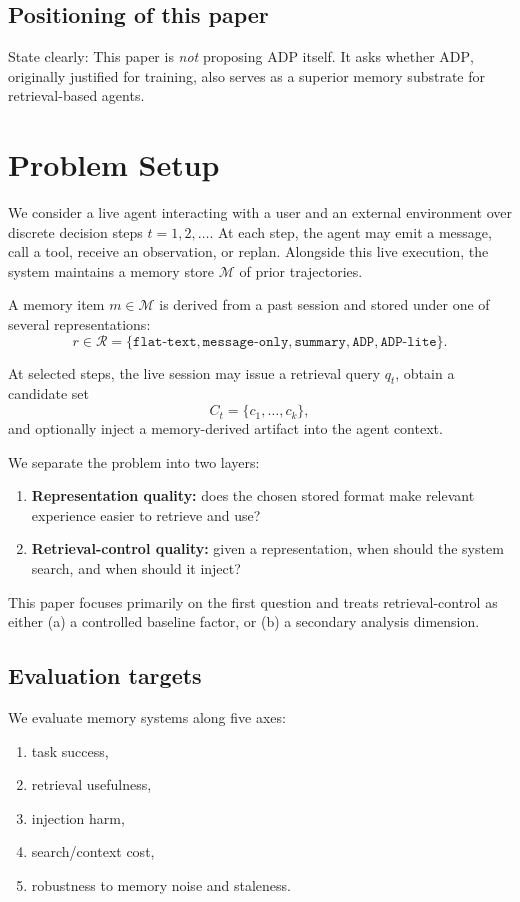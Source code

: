 \documentclass{article}
\newcommand{\ADP}{\textsc{ADP}}
\begin{document}
\subsection{Positioning of this paper}
State clearly:
This paper is \emph{not} proposing \ADP{} itself.
It asks whether \ADP{}, originally justified for training, also serves as a superior memory substrate for
retrieval-based agents.

\section{Problem Setup}

We consider a live agent interacting with a user and an external environment over discrete decision steps
$t = 1,2,\ldots$.
At each step, the agent may emit a message, call a tool, receive an observation, or replan.
Alongside this live execution, the system maintains a memory store $\mathcal{M}$ of prior trajectories.

A memory item $m \in \mathcal{M}$ is derived from a past session and stored under one of several
representations:
\[
r \in \mathcal{R}
=
\{
\texttt{flat-text},
\texttt{message-only},
\texttt{summary},
\texttt{ADP},
\texttt{ADP-lite}
\}.
\]

At selected steps, the live session may issue a retrieval query $q_t$, obtain a candidate set
\[
C_t = \{c_1,\dots,c_k\},
\]
and optionally inject a memory-derived artifact into the agent context.

We separate the problem into two layers:
\begin{enumerate}[leftmargin=*,itemsep=2pt,topsep=2pt]
    \item \textbf{Representation quality:}
    does the chosen stored format make relevant experience easier to retrieve and use?
    \item \textbf{Retrieval-control quality:}
    given a representation, when should the system search, and when should it inject?
\end{enumerate}

This paper focuses primarily on the first question and treats retrieval-control as either
(a) a controlled baseline factor, or
(b) a secondary analysis dimension.

\subsection{Evaluation targets}
We evaluate memory systems along five axes:
\begin{enumerate}[leftmargin=*,itemsep=2pt,topsep=2pt]
    \item task success,
    \item retrieval usefulness,
    \item injection harm,
    \item search/context cost,
    \item robustness to memory noise and staleness.
\end{enumerate}
\end{document}
